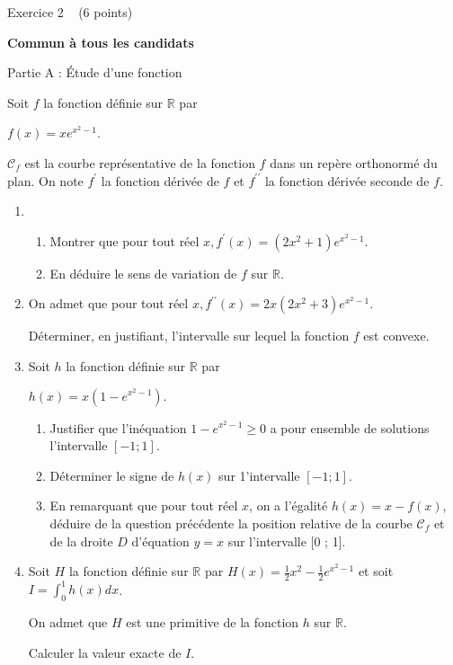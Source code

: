 
%
\begin{h2}Exercice 2   (6 points)\end{h2}
\textbf{Commun  à tous les candidats}
\begin{h3}Partie A : Étude d'une fonction\end{h3}
Soit $f$ la fonction définie sur $\mathbb{R}$ par

\begin{center}
$f\left(x\right) = x e^{x^{2}-1}$.
\end{center}

$\mathscr C_{f}$ est la courbe représentative de la fonction $f$ dans un repère orthonormé du plan. On note $f^{\prime}$ la fonction dérivée de $f$ et $f^{\prime\prime}$ la fonction dérivée seconde de $f$.
\begin{enumerate}
     \item
     \begin{enumerate}[label=\alph*.]
          \item
          Montrer que pour tout réel $x, f^{\prime}\left(x\right)= \left(2x^{2}+1\right) e^{x^{2}-1}$.
          \item
     En déduire le sens de variation de $f$ sur $\mathbb{R}$.\end{enumerate}
     \item
     On admet que pour tout réel $x, f^{\prime\prime}\left(x\right)=2x \left(2x^{2}+3\right) e^{x^{2}-1}$.
     \par
     Déterminer, en justifiant, l'intervalle sur lequel la fonction $f$ est convexe.
     \item
     Soit $h$ la fonction définie sur $\mathbb{R}$ par

\begin{center}
     $h\left(x\right)=x \left(1-e^{x^{2}-1}\right).$
\end{center}

     \begin{enumerate}[label=\alph*.]
          \item
          Justifier que l'inéquation $1-e^{x^{2}-1}\geqslant 0$ a pour ensemble de solutions l'intervalle $\left[-1 ; 1\right]$.
          \item
          Déterminer le signe de $h\left(x\right)$ sur 1'intervalle $\left[-1 ; 1\right]$.
          \item
     En remarquant que pour tout réel $x$, on a l'égalité $h\left(x\right)=x-f\left(x\right)$, déduire de la question précédente la position relative de la courbe $\mathscr C_{f}$ et de la droite $D$ d'équation $y=x$ sur l'intervalle [0 ;  1].\end{enumerate}
     \item
     Soit $H$ la fonction définie sur $\mathbb{R}$ par $H\left(x\right)=\frac{1}{2}x^{2}-\frac{1}{2}e^{x^{2}-1}$ et soit $I=\int_{0}^{1} h\left(x\right)dx$.
     \par
     On admet que $H$ est une primitive de la fonction $h$ sur $\mathbb{R}$.
     \par
     Calculer la valeur exacte de $I$.
\end{enumerate}
